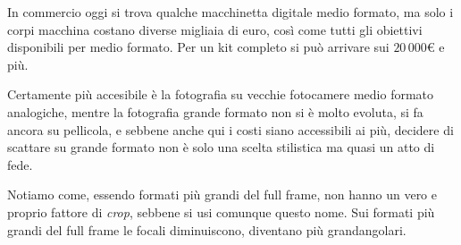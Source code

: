 In commercio oggi si trova qualche macchinetta digitale medio formato, ma solo i corpi macchina costano diverse migliaia di euro, così come tutti gli obiettivi disponibili per medio formato. Per un kit completo si può arrivare sui $20\,000 \euro{}$ e più.

Certamente più accesibile è la fotografia su vecchie fotocamere medio formato analogiche, mentre la fotografia grande formato non si è molto evoluta, si fa ancora su pellicola, e sebbene anche qui i costi siano accessibili ai più, decidere di scattare su grande formato non è solo una scelta stilistica ma quasi un atto di fede.

Notiamo come, essendo formati più grandi del full frame, non hanno un vero e proprio fattore di \textit{crop}, sebbene si usi comunque questo nome. Sui formati più grandi del full frame le focali diminuiscono, diventano più grandangolari.